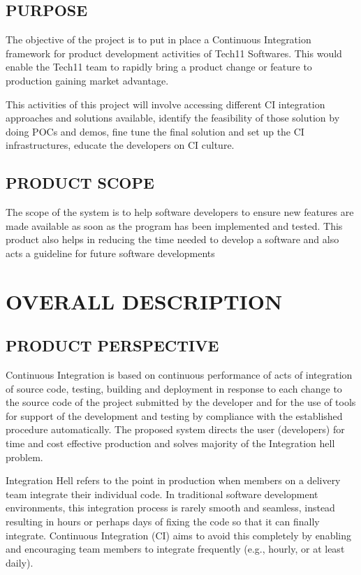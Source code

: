 \documentclass[12pt,a4paper,oneside]{report}
\begin{document}
{\section{PURPOSE}
\par The objective of the project is to put in place a Continuous Integration framework for product
development activities of Tech11 Softwares. This would enable the Tech11 team to rapidly bring a
product change or feature to production gaining market advantage.
\par
This activities of this project will involve accessing different CI integration approaches and
solutions available, identify the feasibility of those solution by doing POCs and demos, fine tune the
final solution and set up the CI infrastructures, educate the developers on CI culture.

\section{PRODUCT SCOPE}
\par  The scope of the system is to help software developers to ensure new features are made available as soon as the program has been
implemented and tested. This product also helps in reducing the time needed to develop a software and also acts a guideline for future software developments


\chapter{OVERALL DESCRIPTION}
\section{PRODUCT PERSPECTIVE}
\par
Continuous Integration is based on continuous performance of acts of integration of
source code, testing, building and deployment in response to each change to the source code of
the project submitted by the developer and for the use of tools for support of the development
and testing by compliance with the established procedure automatically. The proposed system
directs the user (developers) for time and cost effective production and solves majority of the
Integration hell problem. \par
Integration Hell refers to the point in production when members on a delivery team integrate
their individual code. In traditional software development environments, this integration
process is rarely smooth and seamless, instead resulting in hours or perhaps days of fixing the
code so that it can finally integrate. Continuous Integration (CI) aims to avoid this completely
by enabling and encouraging team members to integrate frequently (e.g., hourly, or at least
daily).

}
\end{document}
